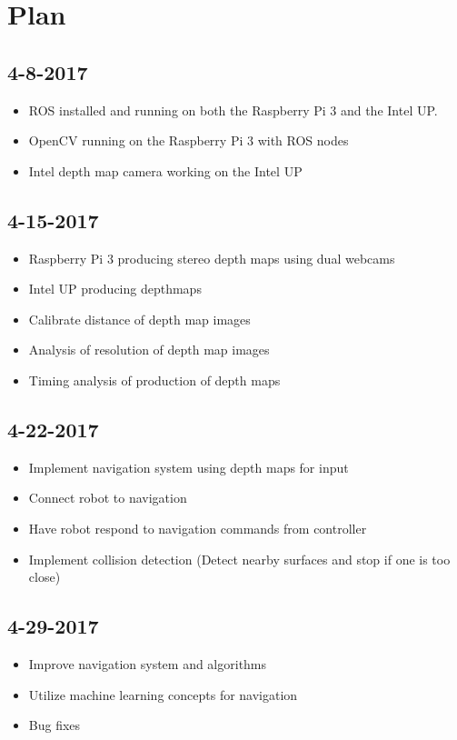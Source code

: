 \documentclass[11pt]{amsart}
\begin{document}
\section{Plan}
\subsection*{4-8-2017}
\begin{itemize}
\item ROS installed and running on both the Raspberry Pi 3 and the Intel UP.
\item OpenCV running on the Raspberry Pi 3 with ROS nodes
\item Intel depth map camera working on the Intel UP
\end{itemize}

\subsection*{4-15-2017}
\begin{itemize}
\item Raspberry Pi 3 producing stereo depth maps using dual webcams
\item Intel UP producing depthmaps
\item Calibrate distance of depth map images
\item Analysis of resolution of depth map images
\item Timing analysis of production of depth maps
\end{itemize}

\subsection*{4-22-2017}
\begin{itemize}
\item Implement navigation system using depth maps for input
\item Connect robot to navigation
\item Have robot respond to navigation commands from controller
\item Implement collision detection (Detect nearby surfaces and stop if one is too close)
\end{itemize}

\subsection*{4-29-2017}
\begin{itemize}
\item Improve navigation system and algorithms
\item Utilize machine learning concepts for navigation
\item Bug fixes
\end{itemize}
\end{document}

